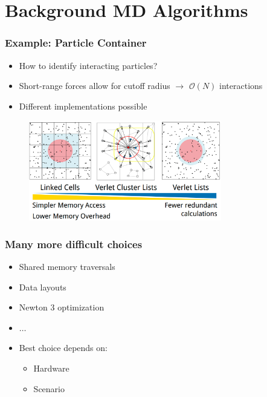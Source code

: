 \documentclass[
	10pt,
	t		%
]{beamer}
\begin{document}
\section{Background MD Algorithms}

\begin{frame}
    \frametitle{Example: Particle Container}

    \begin{itemize}
        \item How to identify interacting particles?
        \item Short-range forces allow for cutoff radius $\rightarrow$ $\mathcal{O}(N)$ interactions
        \item Different implementations possible
    \end{itemize}

    \vspace{0.2cm}
    \begin{figure}
        \centering
        \includegraphics[width=0.75\textwidth]{figures/particle_containers.png}
        \caption{\small{
                \cite{SIAM_PP24}}}
    \end{figure}

\end{frame}


\begin{frame}
    \frametitle{Many more difficult choices}
    \begin{itemize}
        \item Shared memory traversals
        \item Data layouts
        \item Newton 3 optimization
        \item $\dots$


        \item Best choice depends on:
              \begin{itemize}
                  \item Hardware
                  \item Scenario
              \end{itemize}
    \end{itemize}

\end{frame}
\end{document}
